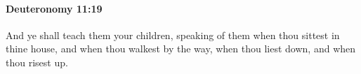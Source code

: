 
		\paragraph{Deuteronomy 11:19} %
			\label{DEUTERONOMY-11-19}

			And ye shall teach them your children, speaking of them when thou sittest in thine house, and when thou walkest by the way, when thou liest down, and when thou risest up.


